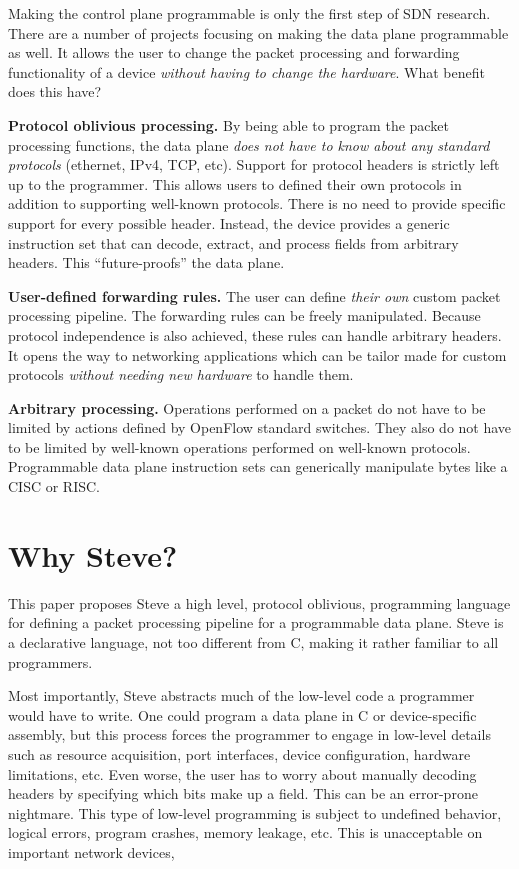 Making the control plane programmable is only the first step of SDN research. There are a number of projects focusing on making the data plane programmable as well. It allows the user to change the packet processing and forwarding functionality of a device \textit{without having to change the hardware}. What benefit does this have?

\textbf{Protocol oblivious processing.} By being able to program the packet processing functions, the data plane \textit{does not have to know about any standard protocols} (ethernet, IPv4, TCP, etc). Support for protocol headers is strictly left up to the programmer. This allows users to defined their own protocols in addition to supporting well-known protocols. There is no need to provide specific support for every possible header. Instead, the device provides a generic instruction set that can decode, extract, and process fields from arbitrary headers. This ``future-proofs'' the data plane.

\textbf{User-defined forwarding rules.} The user can define \textit{their own} custom packet processing pipeline. The forwarding rules can be freely manipulated. Because protocol independence is also achieved, these rules can handle arbitrary headers. It opens the way to networking applications which can be tailor made for custom protocols \textit{without needing new hardware} to handle them.

\textbf{Arbitrary processing.} Operations performed on a packet do not have to be limited by actions defined by OpenFlow standard switches. They also do not have to be limited by well-known operations performed on well-known protocols. Programmable data plane instruction sets can generically manipulate bytes like a CISC or RISC.

\section{Why Steve?}

This paper proposes Steve a high level, protocol oblivious, programming language for defining a packet processing pipeline for a programmable data plane. Steve is a declarative language, not too different from C, making it rather familiar to all programmers.

Most importantly, Steve abstracts much of the low-level code a programmer would have to write. One could program a data plane in C or device-specific assembly, but this process forces the programmer to engage in low-level details such as resource acquisition, port interfaces, device configuration, hardware limitations, etc. Even worse, the user has to worry about manually decoding headers by specifying which bits make up a field. This can be an error-prone nightmare. This type of low-level programming is subject to undefined behavior, logical errors, program crashes, memory leakage, etc. This is unacceptable on important network devices,

